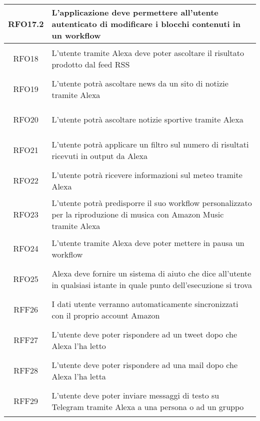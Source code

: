 \begin{longtable}{|c|X|}
	\hypertarget{RFO17.2}{RFO17.2} & L'applicazione deve permettere all'utente autenticato di modificare i blocchi contenuti in un workflow\\ \hline
	
	\hypertarget{RFO18}{RFO18} & L'utente tramite Alexa deve poter ascoltare il risultato prodotto dal feed RSS\\ \hline
	
	\hypertarget{RFO19}{RFO19} & L'utente potrà ascoltare news da un sito di notizie tramite Alexa\\ \hline
	
	\hypertarget{RFO20}{RFO20} & L'utente potrà ascoltare notizie sportive tramite Alexa \\ \hline
	
	\hypertarget{RFO21}{RFO21} & L'utente potrà applicare un filtro sul numero di risultati ricevuti in output da Alexa \\ \hline
	
	\hypertarget{RFO22}{RFO22} & L'utente potrà ricevere informazioni sul meteo tramite Alexa \\ \hline
	
	\hypertarget{RFO23}{RFO23} & L'utente potrà predisporre il suo workflow personalizzato per la riproduzione di musica con Amazon Music tramite Alexa \\ \hline
	
	\hypertarget{RFO24}{RFO24} & L'utente tramite Alexa deve poter mettere in pausa un workflow \\ \hline
	
	\hypertarget{RFO25}{RFO25} & Alexa deve fornire un sistema di aiuto che dice all'utente in qualsiasi istante in quale punto dell'esecuzione si trova \\ \hline
	
	\hypertarget{RFF26}{RFF26} & I dati utente verranno automaticamente sincronizzati con il proprio account Amazon \\ \hline
	
	\hypertarget{RFF27}{RFF27} & L'utente deve poter rispondere ad un tweet dopo che Alexa l'ha letto \\ \hline
	
	\hypertarget{RFF28}{RFF28} & L'utente deve poter rispondere ad una mail dopo che Alexa l'ha letta \\ \hline
	
	\hypertarget{RFF29}{RFF29} & L'utente deve poter inviare messaggi di testo su Telegram tramite Alexa a una persona o ad un gruppo\\ \hline
	

\end{longtable}
